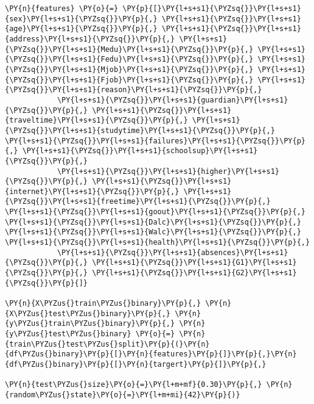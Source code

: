     \begin{tcolorbox}[breakable, size=fbox, boxrule=1pt, pad at break*=1mm,colback=cellbackground, colframe=cellborder]
\begin{Verbatim}[commandchars=\\\{\}]
\PY{n}{features} \PY{o}{=} \PY{p}{[}\PY{l+s+s1}{\PYZsq{}}\PY{l+s+s1}{sex}\PY{l+s+s1}{\PYZsq{}}\PY{p}{,} \PY{l+s+s1}{\PYZsq{}}\PY{l+s+s1}{age}\PY{l+s+s1}{\PYZsq{}}\PY{p}{,} \PY{l+s+s1}{\PYZsq{}}\PY{l+s+s1}{address}\PY{l+s+s1}{\PYZsq{}}\PY{p}{,} \PY{l+s+s1}{\PYZsq{}}\PY{l+s+s1}{Medu}\PY{l+s+s1}{\PYZsq{}}\PY{p}{,} \PY{l+s+s1}{\PYZsq{}}\PY{l+s+s1}{Fedu}\PY{l+s+s1}{\PYZsq{}}\PY{p}{,} \PY{l+s+s1}{\PYZsq{}}\PY{l+s+s1}{Mjob}\PY{l+s+s1}{\PYZsq{}}\PY{p}{,} \PY{l+s+s1}{\PYZsq{}}\PY{l+s+s1}{Fjob}\PY{l+s+s1}{\PYZsq{}}\PY{p}{,} \PY{l+s+s1}{\PYZsq{}}\PY{l+s+s1}{reason}\PY{l+s+s1}{\PYZsq{}}\PY{p}{,}
            \PY{l+s+s1}{\PYZsq{}}\PY{l+s+s1}{guardian}\PY{l+s+s1}{\PYZsq{}}\PY{p}{,} \PY{l+s+s1}{\PYZsq{}}\PY{l+s+s1}{traveltime}\PY{l+s+s1}{\PYZsq{}}\PY{p}{,} \PY{l+s+s1}{\PYZsq{}}\PY{l+s+s1}{studytime}\PY{l+s+s1}{\PYZsq{}}\PY{p}{,} \PY{l+s+s1}{\PYZsq{}}\PY{l+s+s1}{failures}\PY{l+s+s1}{\PYZsq{}}\PY{p}{,} \PY{l+s+s1}{\PYZsq{}}\PY{l+s+s1}{schoolsup}\PY{l+s+s1}{\PYZsq{}}\PY{p}{,}
            \PY{l+s+s1}{\PYZsq{}}\PY{l+s+s1}{higher}\PY{l+s+s1}{\PYZsq{}}\PY{p}{,} \PY{l+s+s1}{\PYZsq{}}\PY{l+s+s1}{internet}\PY{l+s+s1}{\PYZsq{}}\PY{p}{,} \PY{l+s+s1}{\PYZsq{}}\PY{l+s+s1}{freetime}\PY{l+s+s1}{\PYZsq{}}\PY{p}{,} \PY{l+s+s1}{\PYZsq{}}\PY{l+s+s1}{goout}\PY{l+s+s1}{\PYZsq{}}\PY{p}{,} \PY{l+s+s1}{\PYZsq{}}\PY{l+s+s1}{Dalc}\PY{l+s+s1}{\PYZsq{}}\PY{p}{,} \PY{l+s+s1}{\PYZsq{}}\PY{l+s+s1}{Walc}\PY{l+s+s1}{\PYZsq{}}\PY{p}{,} \PY{l+s+s1}{\PYZsq{}}\PY{l+s+s1}{health}\PY{l+s+s1}{\PYZsq{}}\PY{p}{,}
            \PY{l+s+s1}{\PYZsq{}}\PY{l+s+s1}{absences}\PY{l+s+s1}{\PYZsq{}}\PY{p}{,} \PY{l+s+s1}{\PYZsq{}}\PY{l+s+s1}{G1}\PY{l+s+s1}{\PYZsq{}}\PY{p}{,} \PY{l+s+s1}{\PYZsq{}}\PY{l+s+s1}{G2}\PY{l+s+s1}{\PYZsq{}}\PY{p}{]}

\PY{n}{X\PYZus{}train\PYZus{}binary}\PY{p}{,} \PY{n}{X\PYZus{}test\PYZus{}binary}\PY{p}{,} \PY{n}{y\PYZus{}train\PYZus{}binary}\PY{p}{,} \PY{n}{y\PYZus{}test\PYZus{}binary} \PY{o}{=} \PY{n}{train\PYZus{}test\PYZus{}split}\PY{p}{(}\PY{n}{df\PYZus{}binary}\PY{p}{[}\PY{n}{features}\PY{p}{]}\PY{p}{,}\PY{n}{df\PYZus{}binary}\PY{p}{[}\PY{n}{targert}\PY{p}{]}\PY{p}{,} 
                                                                                \PY{n}{test\PYZus{}size}\PY{o}{=}\PY{l+m+mf}{0.30}\PY{p}{,} \PY{n}{random\PYZus{}state}\PY{o}{=}\PY{l+m+mi}{42}\PY{p}{)}
\end{Verbatim}
\end{tcolorbox}

